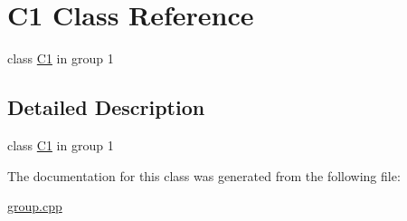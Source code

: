 \hypertarget{classC1}{\section{C1 Class Reference}
\label{classC1}
}


class \hyperlink{classC1}{C1} in group 1  




\subsection{Detailed Description}
class \hyperlink{classC1}{C1} in group 1 

The documentation for this class was generated from the following file\-:\begin{DoxyCompactItemize}
\item 
\hyperlink{group_8cpp}{group.\-cpp}\end{DoxyCompactItemize}
